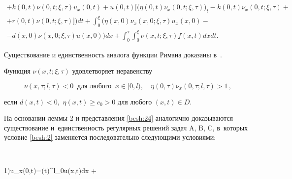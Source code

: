 \begin{remark}
\begin{multline}
\\ +

k(0,t)\nu(0,t;\xi,\tau)u_{x}(0,t)

+u(0,t)

\Big[\big(\eta(0,t)\nu_{x}(0,t;\xi,\tau)\big)_{t}-k(0,t)\nu_{x}(0,t;\xi,\tau)+

\\

+r(0,t)\nu(0,t;\xi,\tau)\Big]\Big)dt+

\int^{\xi}_0\Big(\eta(x, 0)\nu_{x}(x, 0;\xi,\tau)u_{x}(x, 0)-

\\

-d(x, 0)\nu(x, 0;\xi,\tau)u(x, 0)

\Big)dx+\int^{\tau}_0 \int^{\xi}_0\nu(x,t;\xi,\tau)f(x,t)dxdt.

\label{besh:24}

\end{multline}

Существование и единственность аналога функции Римана доказаны в~\cite{besh:bib:Shhanukov}.

\end{remark}



\smallskip







\begin{lemma}[2]Функция $\nu(x,t;\xi,\tau)$ удовлетворяет неравенству

$$

\nu(x,\tau;l,\tau) <0\ \text{ для любого }\ x \in [0, l),\quad

\eta(0,\tau)\nu_{x}(0,\tau;l,\tau) >1\,,

$$

если $d(x,t)<0,$ $\eta(x,t)\geq c_{0} >0$ для любого $(x,t) \in D.$

\end{lemma}



\smallskip



На основании леммы 2 и представления \eqref{besh:24} аналогично  доказываются существование и~единственность регулярных решений задач A, B, C, в~которых условие \eqref{besh:2} заменяется последовательно следующими условиями:

$$

1)\quad u_{x}(0,t)=\beta(t)\int^{l}_{0}u(x,t)dx +

